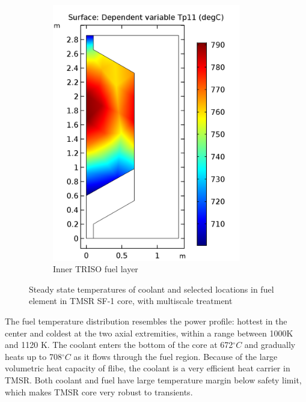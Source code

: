 \documentclass{elsarticle}
\begin{document}
\begin{figure}[h]
\begin{subfigure}[b]{0.3\textwidth}
        \includegraphics[width=0.9\textwidth]{./images/diffusion/tmsr/SS/ms/Tp11(steady_state).png}
        \caption{Inner TRISO fuel layer}
    \end{subfigure}

  \caption{Steady state temperatures of coolant and selected locations in fuel element in TMSR SF-1 core, with multiscale treatment}
  \label{fig:tmsr_temp_ss}
\end{figure}



The fuel temperature distribution resembles the power profile: hottest in the center and coldest at the two axial extremities, within a range between 1000K and 1120 K. 
The coolant enters the bottom of the core at 672$^{\circ}C$ and gradually heats up to 708$^{\circ}C$ as it flows through the fuel region.
Because of the large volumetric heat capacity of flibe, the coolant is a very efficient heat carrier in TMSR. Both coolant and fuel have large temperature margin below safety limit, which makes TMSR core very robust to transients.
\end{document}
